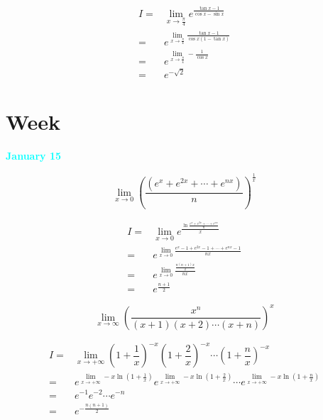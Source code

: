 \begin{solution}

	\begin{align*}
		I = & \lim\limits_{x\to \frac{\pi}{4}}e^{\frac{\tan x-1}{\cos x-\sin x}}\\
		  = & e^{\lim\limits_{x\to \frac{\pi}{4}}\frac{\tan x-1}{\cos x(1-\tan x)}}\\
		  = & e^{\lim\limits_{x\to \frac{\pi}{4}}-\frac{1}{\cos x}}\\
		  = & e^{-\sqrt{2}}
	\end{align*}
\end{solution}


\section{Week }
\textcolor{cyan}{\textbf{January 15}}

\begin{example}[][Exam: 27.3.1]
	$$\lim\limits_{x\to 0}\left(\dfrac{(e^{x}+e^{2x}+\cdots +e^{nx})}{n} \right)^{\frac{1}{x}}$$
\end{example}

\begin{solution}

	\begin{align*}
		I = & \lim\limits_{x\to 0}e^{\frac{\ln \frac{e^{x}+e^{2x}+\cdots +e^{nx}}{n}}{x}}\\
		  = & e^{\lim\limits_{x\to 0}\frac{e^{x}-1+e^{2x}-1+\cdots +e^{nx}-1}{nx}}\\
		  = & e^{\lim\limits_{x\to 0}\frac{\frac{n(n+1)x}{2}}{nx}}\\
		  = & e^{\frac{n+1}{2}}
	\end{align*}
\end{solution}

\begin{example}[][Exam: 27.3.2]
	$$\lim\limits_{x\to \infty}\left(\dfrac{x^{n}}{(x+1)(x+2)\cdots(x+n)} \right)^{x}$$
\end{example}
 
\begin{solution}

	\begin{align*}
		I = & \lim\limits_{x\to +\infty}\left(1+\dfrac{1}{x}\right)^{-x}\left(1+\dfrac{2}{x}\right)^{-x}\cdots \left(1+\dfrac{n}{x}\right)^{-x}\\
		  = & e^{\lim\limits_{x\to +\infty}-x\ln(1+\frac{1}{x})}e^{\lim\limits_{x\to +\infty}-x\ln(1+\frac{2}{x})}\cdots e^{\lim\limits_{x\to +\infty}-x\ln(1+\frac{n}{x})}\\
		  = & e^{-1}e^{-2}\cdots e^{-n}\\
		  = & e^{-\frac{n(n+1)}{2}}
	\end{align*}
\end{solution}

